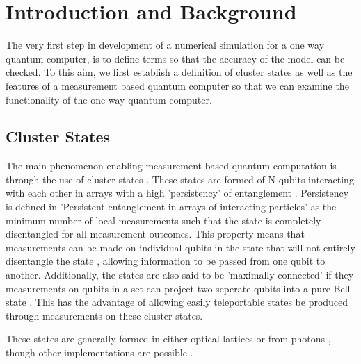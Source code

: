 
\chapter{Introduction and Background} %

\label{ch:intro} %

The very first step in development of a numerical simulation for a one way quantum computer, is to define terms so that the accuracy of the model can be checked. To this aim, we first establish a definition of cluster states as well as the features of a measurement based quantum computer so that we can examine the functionality of the one way quantum computer.



\section{Cluster States}

The main phenomenon enabling measurement based quantum computation is through the use of cluster states \citep{briegel_measurement-based_2009}. These states are formed of N qubits interacting with each other in arrays with a high 'persistency' of entanglement \citep{briegel_persistent_2000}. Persistency is defined in 'Persistent entanglement in arrays of interacting particles' as the minimum number of local measurements such that the state is completely disentangled for all measurement outcomes. This property means that measurements can be made on individual qubits in the state that will not entirely disentangle the state \citep{briegel_persistent_2000}, allowing information to be passed from one qubit to another. Additionally, the states are also said to be 'maximally connected' if they measurements on qubits in a set can project two seperate qubits into a pure Bell state \citep{briegel_persistent_2000}. This has the advantage of allowing easily teleportable states be produced through measurements on these cluster states.

These states are generally formed in either optical lattices \citep{joo_generating_2012} or from photons \citep{kiesel_experimental_2005, walther_experimental_2005}, though other implementations are possible \citep{briegel_measurement-based_2009}.


